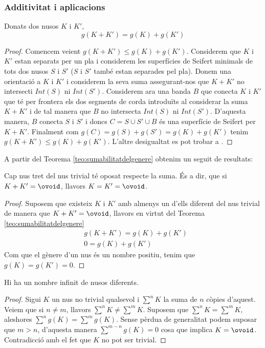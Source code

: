 \subsubsection{Additivitat i aplicacions}

\begin{theorem}\label{teo:sumabilitatdelgenere}
	Donats dos nusos $K$ i $K'$, $$g(K+K')=g(K)+g(K')$$
\end{theorem}

\begin{proof}
	Comencem veient $g(K+K')\leq g(K)+g(K')$. Considerem que $K$ i $K'$ estan separats per un pla i considerem les superfícies de Seifert minimals de tots dos nusos $S$ i $S'$ ($S$ i $S'$ també estan separades pel pla). Donem una orientació a $K$ i $K'$ i considerem la seva suma assegurant-nos que $K+K'$ no intersecti $Int(S)$ ni $Int(S')$. Considerem ara una banda $B$ que conecta $K$ i $K'$ que té per frontera els dos segments de corda introduïts al considerar la suma $K+K'$ i de tal manera que $B$ no intersecta $Int(S)$ ni $Int(S')$. D'aquesta manera, $B$ conecta $S$ i $S'$ i doncs $C=S\cup S'\cup B$ és una superfície de Seifert per $K+K'$. Finalment com $g(C)=g(S)+g(S')=g(K)+g(K')$ tenim $g(K+K')\leq g(K)+g(K')$. L'altre desigualtat es pot trobar a \cite{rolfsen2003knots}.
\end{proof}

A partir del Teorema \ref{teo:sumabilitatdelgenere} obtenim un seguit de resultats:

\begin{corolary}
	Cap nus tret del nus trivial té oposat respecte la suma. És a dir, que si $K+K'=\ovoid$, llavors $K=K'=\ovoid$.
\end{corolary}

\begin{proof}
	Suposem que existeix $K$ i $K'$ amb almenys un d'ells diferent del nus trivial de manera que $K+K'=\ovoid$, llavors en virtut del Teorema \ref{teo:sumabilitatdelgenere}
	\begin{align*}
		&g(K+K')=g(K)+g(K')\\
		&0=g(K)+g(K')
	\end{align*}
	Com que el gènere d'un nus és un nombre positiu, tenim que $g(K)=g(K')=0$.
\end{proof}

\begin{corolary}
	Hi ha un nombre infinit de nusos diferents.
\end{corolary}

\begin{proof}
	Sigui $K$ un nus no trivial qualsevol i $\sum^{n}K$ la suma de $n$ còpies d'aquest. Veiem que si $n\neq m$, llavors $\sum^{n}K\neq\sum^{m}K$. Suposem que $\sum^{n}K=\sum^{m}K$, aleshores $\sum^{n}g(K)=\sum^{m}g(K)$. Sense pèrdua de generalitat podem suposar que $m>n$, d'aquesta manera $\sum^{m-n}g(K)=0$ cosa que implica $K=\ovoid$. Contradicció amb el fet que $K$ no pot ser trivial.
\end{proof}

